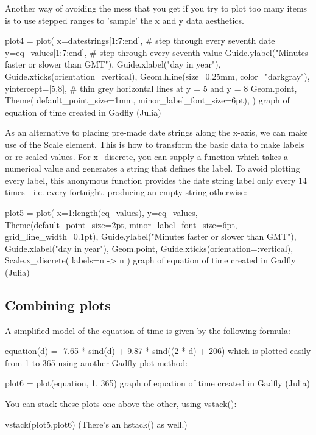Another way of avoiding the mess that you get if you try to plot too many items is to use stepped ranges to 'sample' the x and y data aesthetics.

plot4 = plot(
 x=datestrings[1:7:end],                                       # step through every seventh date
 y=eq_values[1:7:end],                                         # step through every seventh value
 Guide.ylabel("Minutes faster or slower than GMT"),
 Guide.xlabel("day in year"),
 Guide.xticks(orientation=:vertical),
 Geom.hline(size=0.25mm, color="darkgray"), yintercept=[5,8],  # thin grey horizontal lines at y = 5 and y = 8
 Geom.point,
 Theme(
     default_point_size=1mm, 
     minor_label_font_size=6pt),
)
graph of equation of time created in Gadfly (Julia)

As an alternative to placing pre-made date strings along the x-axis, we can make use of the Scale element. This is how to transform the basic data to make labels or re-scaled values. For x_discrete, you can supply a function which takes a numerical value and generates a string that defines the label. To avoid plotting every label, this anonymous function provides the date string label only every 14 times - i.e. every fortnight, producing an empty string otherwise:

plot5 = plot(
   x=1:length(eq_values),    
   y=eq_values, 
   Theme(default_point_size=2pt, 
         minor_label_font_size=6pt,
         grid_line_width=0.1pt),
   Guide.ylabel("Minutes faster or slower than GMT"),
   Guide.xlabel("day in year"),
   Geom.point,
   Guide.xticks(orientation=:vertical),
   Scale.x_discrete(
         labels=n -> n%
)
graph of equation of time created in Gadfly (Julia)

\subsection*{Combining plots}
A simplified model of the equation of time is given by the following formula:

equation(d) = -7.65 * sind(d) + 9.87 * sind((2 * d) + 206)
which is plotted easily from 1 to 365 using another Gadfly plot method:

plot6 = plot(equation, 1, 365)
graph of equation of time created in Gadfly (Julia)

You can stack these plots one above the other, using vstack():

vstack(plot5,plot6)
(There's an hstack() as well.)

